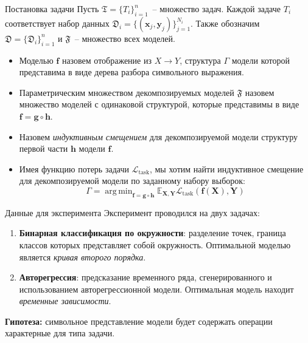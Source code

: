 \documentclass{beamer}
\DeclareMathOperator*{\argmin}{arg\,min}
\begin{document}
\begin{frame}{Постановка задачи}
Пусть \(\mathfrak{T} = \{T_i\}_{i=1}^n\)~-- множество задач. Каждой задаче \(T_i\) соответствует набор данных \( \mathfrak{D}_i = \{(\mathbf{x}_j, \mathbf{y}_j) \}_{j=1}^{N_i} \). Также обозначим \(\mathfrak{D} = \{ \mathfrak{D}_i\}_{i=1}^n\) и \(\mathfrak{F}\)~-- множество всех моделей.
\begin{itemize}
    \item Моделью \(\mathbf{f}\) назовем отображение из \(X \rightarrow Y\), структура \(\Gamma\) модели которой представима в виде дерева разбора символьного выражения. 
    \item Параметрическим множеством декомпозируемых моделей \(\mathfrak{F}\) назовем множество моделей с одинаковой структурой, которые представимы в виде \(\mathbf{f} = \mathbf{g} \circ \mathbf{h}\). 
    \item Назовем \textit{индуктивным смещением} для декомпозируемой модели структуру первой части \(\mathbf{h}\) модели \(\mathbf{f}\).
    \item Имея функцию потерь задачи \(\mathcal{L}_{\text{task}}\), мы хотим найти индуктивное смещение для декомпозируемой модели по заданному набору выборок:
    \[
        \Gamma = \argmin_{\mathbf{f} = \mathbf{g} \circ \mathbf{h}} \mathbb{E}_{\mathbf{X}, \mathbf{Y}} \mathcal{L}_{\text{task}} (\mathbf{f}(\mathbf{X}), \mathbf{Y})
    \]
\end{itemize}

\end{frame}
\begin{frame}{Данные для эксперимента}
Эксперимент проводился на двух задачах:
\begin{enumerate}
    \item \textbf{Бинарная классификация по окружности}: разделение точек, граница классов которых представляет собой окружность. Оптимальной моделью является \textit{кривая второго порядка}.
    \item \textbf{Авторегрессия}: предсказание временного ряда, сгенерированного и использованием авторегрессионной модели. Оптимальная модель находит \textit{временные зависимости}.
\end{enumerate}


\textbf{Гипотеза:} символьное представление модели будет содержать операции характерные для типа задачи.
\end{frame}
\end{document}

